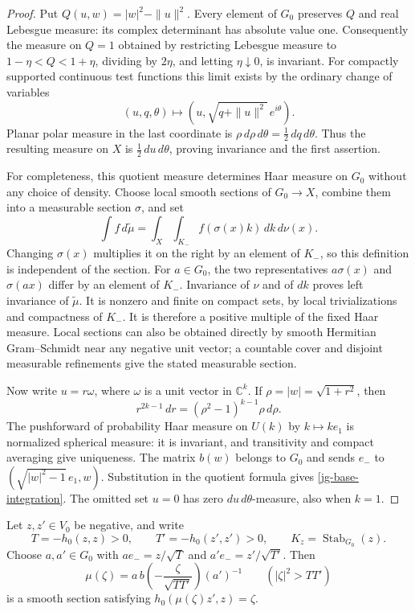 \begin{proof}
Put \(Q(u,w)=|w|^2-\|u\|^2\).
Every element of \(G_0\) preserves \(Q\) and real Lebesgue measure:
its complex determinant has absolute value one.
Consequently the measure on \(Q=1\) obtained by restricting
Lebesgue measure to \(1-\eta<Q<1+\eta\), dividing by \(2\eta\),
and letting \(\eta\downarrow0\), is invariant.
For compactly supported continuous test functions this limit exists
by the ordinary change of variables
\[
       (u,q,\theta)\longmapsto
               (u,\sqrt{q+\|u\|^2}\,e^{i\theta}).
\]
Planar polar measure in the last coordinate is
\(\rho\,d\rho\,d\theta=\tfrac12\,dq\,d\theta\).
Thus the resulting measure on \(X\) is
\(\tfrac12\,du\,d\theta\), proving invariance and the first assertion.

For completeness, this quotient measure determines Haar measure on
\(G_0\) without any choice of density.  Choose local smooth sections
of \(G_0\to X\), combine them into a measurable section \(\sigma\),
and set
\[
 \int f\,d\widetilde\mu
     =\int_X\int_{K_-}f(\sigma(x)k)\,dk\,d\nu(x).
\]
Changing \(\sigma(x)\) multiplies it on the right by an element of
\(K_-\), so this definition is independent of the section.
For \(a\in G_0\), the two representatives
\(a\sigma(x)\) and \(\sigma(ax)\) differ by an element of \(K_-\).
Invariance of \(\nu\) and of \(dk\) proves left invariance of
\(\widetilde\mu\).  It is nonzero and finite on compact sets, by
local trivializations and compactness of \(K_-\).  It is therefore
a positive multiple of the fixed Haar measure.
Local sections can also be obtained directly by smooth Hermitian
Gram--Schmidt near any negative unit vector; a countable cover and
disjoint measurable refinements give the stated measurable section.

Now write \(u=r\omega\), where \(\omega\) is a unit vector in
\(\mathbb C^k\).  If \(\rho=|w|=\sqrt{1+r^2}\), then
\[
 r^{2k-1}\,dr=(\rho^2-1)^{k-1}\rho\,d\rho .
\]
The pushforward of probability Haar measure on \(U(k)\) by
\(k\mapsto k e_1\) is normalized spherical measure: it is invariant,
and transitivity and compact averaging give uniqueness.
The matrix \(b(w)\) belongs to \(G_0\) and sends \(e_-\) to
\((\sqrt{|w|^2-1}\,e_1,w)\).
Substitution in the quotient formula gives
\eqref{jg-base-integration}.  The omitted set \(u=0\) has zero
\(du\,d\theta\)-measure, also when \(k=1\).
\end{proof}

Let \(z,z'\in V_0\) be negative, and write
\[
           T=-h_0(z,z)>0,\qquad T'=-h_0(z',z')>0,
           \qquad K_z=\operatorname{Stab}_{G_0}(z).
\]
Choose \(a,a'\in G_0\) with
\(a e_-=z/\sqrt T\) and \(a'e_-=z'/\sqrt{T'}\).
Then
\[
 \mu(\zeta)=a\,b\!\left(-\frac{\zeta}{\sqrt{TT'}}\right)(a')^{-1}
       \qquad (|\zeta|^2>TT')
\]
is a smooth section satisfying \(h_0(\mu(\zeta)z',z)=\zeta\).

